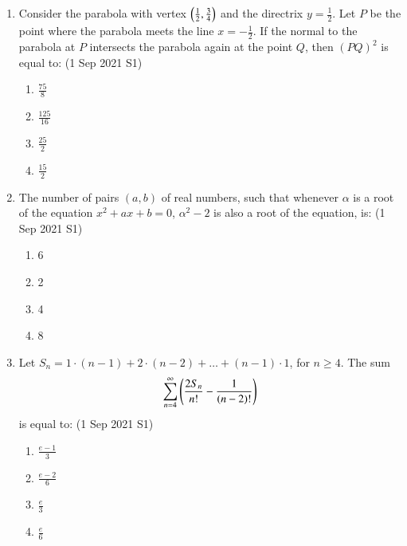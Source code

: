 \documentclass[journal]{IEEEtran}
\begin{document}
\begin{enumerate}
    \item Consider the parabola with vertex $\left(\frac{1}{2}, \frac{3}{4}\right)$ and the directrix $y = \frac{1}{2}$. Let $P$ be the point where the parabola meets the line $x = -\frac{1}{2}$. If the normal to the parabola at $P$ intersects the parabola again at the point $Q$, then $(PQ)^2$ is equal to: \hfill (1 Sep 2021 S1)
    \begin{multicols}{4}
        \begin{enumerate}
            \item $\frac{75}{8}$
            \item $\frac{125}{16}$
            \item $\frac{25}{2}$
            \item $\frac{15}{2}$
        \end{enumerate}
    \end{multicols}

    \item The number of pairs $(a, b)$ of real numbers, such that whenever $\alpha$ is a root of the equation $x^2 + ax + b = 0$, $\alpha^2 - 2$ is also a root of the equation, is: \hfill (1 Sep 2021 S1)
    \begin{multicols}{4}
        \begin{enumerate}
            \item 6
            \item 2
            \item 4
            \item 8
        \end{enumerate}
    \end{multicols}

    \item Let $S_n = 1\cdot(n-1) + 2\cdot(n-2) + \dots + (n-1)\cdot1$, for $n \geq 4$. The sum 
    $$
    \sum_{n=4}^{\infty} \left(\frac{2S_n}{n!} - \frac{1}{(n-2)!}\right)
    $$
    is equal to: \hfill (1 Sep 2021 S1)
    \begin{multicols}{4}
        \begin{enumerate}
            \item $\frac{e - 1}{3}$
            \item $\frac{e - 2}{6}$
            \item $\frac{e}{3}$
            \item $\frac{e}{6}$
        \end{enumerate}
    \end{multicols}
\end{enumerate}
\end{document}
